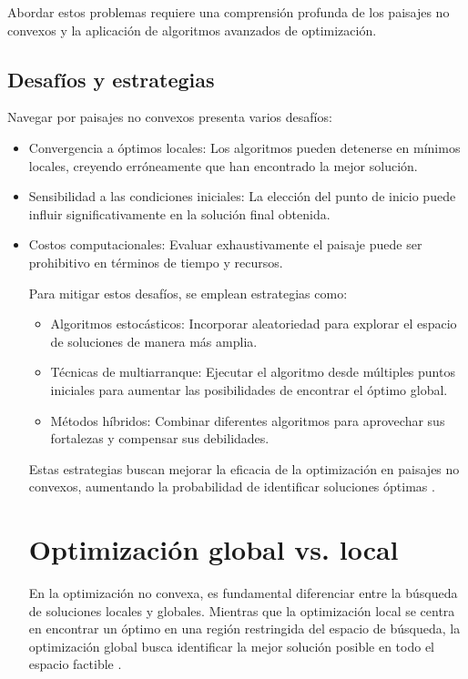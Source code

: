 Abordar estos problemas requiere una comprensión profunda de los paisajes no convexos y la aplicación de algoritmos avanzados de optimización.

\subsection{Desafíos y estrategias}

Navegar por paisajes no convexos presenta varios desafíos:

\begin{itemize}
	\item Convergencia a óptimos locales: Los algoritmos pueden detenerse en mínimos locales, creyendo erróneamente que han encontrado la mejor solución.
	\item Sensibilidad a las condiciones iniciales: La elección del punto de inicio puede influir significativamente en la solución final obtenida.
	\item Costos computacionales: Evaluar exhaustivamente el paisaje puede ser prohibitivo en términos de tiempo y recursos.
	
	Para mitigar estos desafíos, se emplean estrategias como:
	
	\begin{itemize}
		\item Algoritmos estocásticos: Incorporar aleatoriedad para explorar el espacio de soluciones de manera más amplia.
		\item Técnicas de multiarranque: Ejecutar el algoritmo desde múltiples puntos iniciales para aumentar las posibilidades de encontrar el óptimo global.
		\item Métodos híbridos: Combinar diferentes algoritmos para aprovechar sus fortalezas y compensar sus debilidades.
	\end{itemize}
	
	Estas estrategias buscan mejorar la eficacia de la optimización en paisajes no convexos, aumentando la probabilidad de identificar soluciones óptimas \cite{statisticseasily}.
	\section{Optimización global vs. local}
	
	En la optimización no convexa, es fundamental diferenciar entre la búsqueda de soluciones locales y globales. Mientras que la optimización local se centra en encontrar un óptimo en una región restringida del espacio de búsqueda, la optimización global busca identificar la mejor solución posible en todo el espacio factible \cite{boyd2004convex}.
	

\end{itemize}

